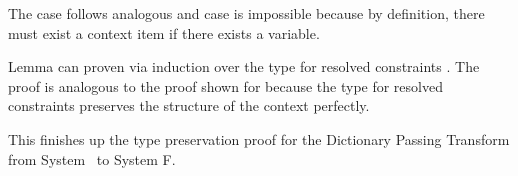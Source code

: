 \noindent The case    follows analogous and case  is impossible because by definition, there must exist a context item if there exists a variable.

\noindent Lemma  can proven via induction over the type for resolved constraints \Data{[}  \Data{]∈} . 
The proof is analogous to the proof shown for  because the type for resolved constraints preserves the structure of the context  perfectly. 

\noindent This finishes up the type preservation proof for the Dictionary Passing Transform from System \Fo\ to System F.